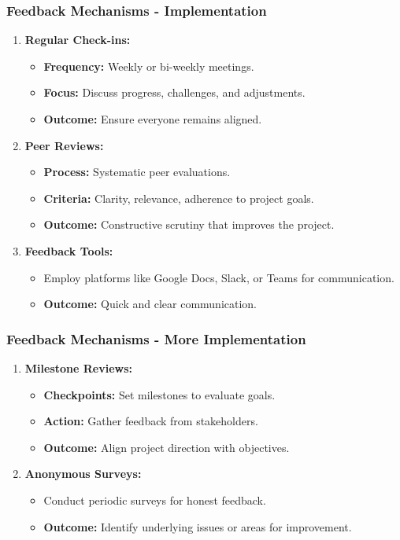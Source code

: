 \documentclass[aspectratio=169]{beamer}
\begin{document}
\begin{frame}[fragile]
    \frametitle{Feedback Mechanisms - Implementation}
    \begin{enumerate}
        \item \textbf{Regular Check-ins:}
        \begin{itemize}
            \item \textbf{Frequency:} Weekly or bi-weekly meetings.
            \item \textbf{Focus:} Discuss progress, challenges, and adjustments.
            \item \textbf{Outcome:} Ensure everyone remains aligned.
        \end{itemize}

        \item \textbf{Peer Reviews:}
        \begin{itemize}
            \item \textbf{Process:} Systematic peer evaluations.
            \item \textbf{Criteria:} Clarity, relevance, adherence to project goals.
            \item \textbf{Outcome:} Constructive scrutiny that improves the project.
        \end{itemize}

        \item \textbf{Feedback Tools:}
        \begin{itemize}
            \item Employ platforms like Google Docs, Slack, or Teams for communication.
            \item \textbf{Outcome:} Quick and clear communication.
        \end{itemize}
    \end{enumerate}
\end{frame}

\begin{frame}[fragile]
    \frametitle{Feedback Mechanisms - More Implementation}
    \begin{enumerate}[resume]
        \item \textbf{Milestone Reviews:}
        \begin{itemize}
            \item \textbf{Checkpoints:} Set milestones to evaluate goals.
            \item \textbf{Action:} Gather feedback from stakeholders.
            \item \textbf{Outcome:} Align project direction with objectives.
        \end{itemize}
        
        \item \textbf{Anonymous Surveys:}
        \begin{itemize}
            \item Conduct periodic surveys for honest feedback.
            \item \textbf{Outcome:} Identify underlying issues or areas for improvement.
        \end{itemize}
    \end{enumerate}
\end{frame}
\end{document}
